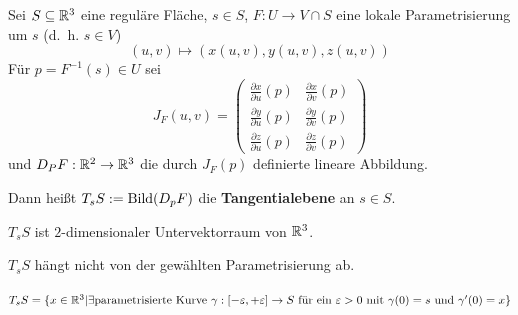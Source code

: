 \begin{definition}%
    Sei $S \subseteq \mathbb{R}^3$ eine reguläre Fläche, $s \in S$,
    $F: U \rightarrow V \cap S$ eine lokale Parametrisierung um $s$
    (d.~h. $s \in V$)
    \[(u,v) \mapsto (x(u,v), y(u,v), z(u,v))\]
    Für $p=F^{-1}(s) \in U$ sei
    \[        J_F(u,v) = \begin{pmatrix}
            \frac{\partial x}{\partial u} (p) & \frac{\partial x}{\partial v} (p)\\
            \frac{\partial y}{\partial u} (p) & \frac{\partial y}{\partial v} (p)\\
            \frac{\partial z}{\partial u} (p) & \frac{\partial z}{\partial v} (p)
        \end{pmatrix}\]
    und $D_P F: \mathbb{R}^2 \rightarrow \mathbb{R}^3$ die durch $J_F (p)$
    definierte lineare Abbildung.

    Dann heißt $T_s S := \operatorname{Bild}(D_p F)$ die \textbf{Tangentialebene}
    an $s \in S$.
\end{definition}

\begin{bemerkung}%
    $T_s S$ ist $2$-dimensionaler Untervektorraum von $\mathbb{R}^3$.
\end{bemerkung}

\begin{bemerkung}%
    $T_s S$ hängt nicht von der gewählten Parametrisierung ab.
\end{bemerkung}

\begin{beweis}\leavevmode
    \begin{behauptung}
        $T_s S = \{x \in \mathbb{R}^3 | \exists \text{parametrisierte Kurve } 
          \gamma:[- \varepsilon, + \varepsilon] \rightarrow S 
          \text{ für ein } \varepsilon > 0 
          \text{ mit } \gamma(0) = s \text{ und } \gamma'(0) = x
          \}$
    \end{behauptung}
\end{beweis}

